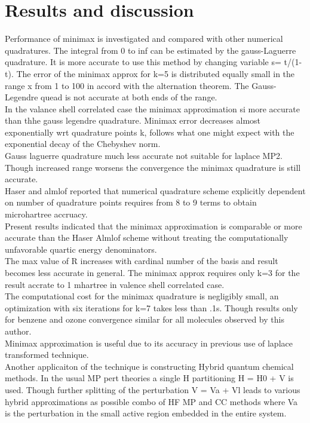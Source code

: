 \documentclass[10pt, draft]{article}
\begin{document}
\section{Results and discussion}
Performance of minimax is investigated and compared with other numerical quadratures.  The integral from 0 to inf can be estimated by the gauss-Laguerre quadrature.  It is more accurate to use this method by changing variable s= t/(1-t).  The error of the minimax approx for k=5 is distributed equally small in the range x from 1 to 100 in accord with the alternation theorem.  The Gauss-Legendre quead is not accurate at both ends of the range. \\
In the valance shell correlated case the minimax approximation si more accurate than thhe gauss legendre quadrature.  Minimax error decreases almost exponentially wrt quadrature points k, follows what one might expect with the exponential decay of the Chebyshev norm.\\
Gauss laguerre quadrature much less accurate not suitable for laplace MP2.  \\
Though increased range worsens the convergence the minimax quadrature is still accurate.  \\
Haser and almlof reported that numerical quadrature scheme explicitly dependent on number of quadrature points requires from 8 to 9 terms to obtain microhartree accruacy.  \\
Present results indicated that the minimax approximation is comparable or more accurate than the Haser Almlof scheme without treating the computationally unfavorable quartic energy denominators.\\
The max value of R increases with cardinal number of the basis and result becomes less accurate in general.  The minimax approx requires only k=3 for the result accrate to 1 mhartree in valence shell correlated case.  \\
The computational cost for the minimax quadrature is negligibly small, an optimization with six iterations for k=7 takes less than .1s.  Though results only for benzene and ozone convergence similar for all molecules observed by this author.  \\
Minimax approximation is useful due to its accuracy in previous use of laplace transformed technique.  \\
Another applicaiton of the technique is constructing Hybrid quantum chemical methods.  In the usual MP pert theories a single H partitioning H = H0 + V is used.  Though further splitting of the perturbation V = Va + Vl leads to various hybrid approximations as possible combo of HF MP and CC methods where Va is the perturbation in the small active region embedded in the entire system.  \\
\end{document}
